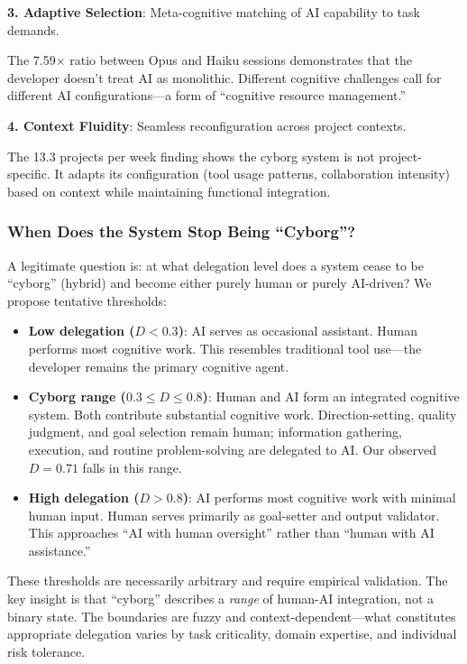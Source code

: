\documentclass{ntlabs-preprint}
\begin{document}
\textbf{3. Adaptive Selection}: Meta-cognitive matching of AI capability to task demands.

The 7.59$\times$ ratio between Opus and Haiku sessions demonstrates that the developer doesn't treat AI as monolithic. Different cognitive challenges call for different AI configurations---a form of ``cognitive resource management.''

\textbf{4. Context Fluidity}: Seamless reconfiguration across project contexts.

The 13.3 projects per week finding shows the cyborg system is not project-specific. It adapts its configuration (tool usage patterns, collaboration intensity) based on context while maintaining functional integration.

\subsubsection{When Does the System Stop Being ``Cyborg''?}

A legitimate question is: at what delegation level does a system cease to be ``cyborg'' (hybrid) and become either purely human or purely AI-driven? We propose tentative thresholds:

\begin{itemize}
    \item \textbf{Low delegation ($D < 0.3$)}: AI serves as occasional assistant. Human performs most cognitive work. This resembles traditional tool use---the developer remains the primary cognitive agent.

    \item \textbf{Cyborg range ($0.3 \leq D \leq 0.8$)}: Human and AI form an integrated cognitive system. Both contribute substantial cognitive work. Direction-setting, quality judgment, and goal selection remain human; information gathering, execution, and routine problem-solving are delegated to AI. Our observed $D = 0.71$ falls in this range.

    \item \textbf{High delegation ($D > 0.8$)}: AI performs most cognitive work with minimal human input. Human serves primarily as goal-setter and output validator. This approaches ``AI with human oversight'' rather than ``human with AI assistance.''
\end{itemize}

These thresholds are necessarily arbitrary and require empirical validation. The key insight is that ``cyborg'' describes a {\itshape range} of human-AI integration, not a binary state. The boundaries are fuzzy and context-dependent---what constitutes appropriate delegation varies by task criticality, domain expertise, and individual risk tolerance.
\end{document}
